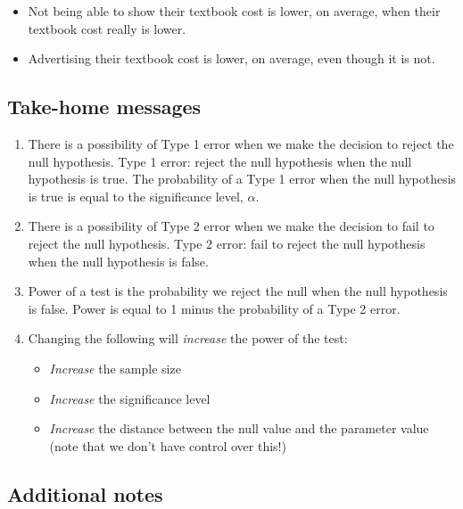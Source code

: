 \documentclass[
]{report}
\begin{document}
\begin{itemize}
\item
  Not being able to show their textbook cost is lower, on average, when their textbook cost really is lower.
\item
  Advertising their textbook cost is lower, on average, even though it is not.
\end{itemize}

\vspace{0.8in}

\subsection{Take-home messages}\label{take-home-messages-14}

\begin{enumerate}
\def\labelenumi{\arabic{enumi}.}
\item
  There is a possibility of Type 1 error when we make the decision to reject the null hypothesis. Type 1 error: reject the null hypothesis when the null hypothesis is true. The probability of a Type 1 error when the null hypothesis is true is equal to the significance level, \(\alpha\).
\item
  There is a possibility of Type 2 error when we make the decision to fail to reject the null hypothesis. Type 2 error: fail to reject the null hypothesis when the null hypothesis is false.
\item
  Power of a test is the probability we reject the null when the null hypothesis is false. Power is equal to 1 minus the probability of a Type 2 error.
\item
  Changing the following will \emph{increase} the power of the test:

  \begin{itemize}
  \item
    \emph{Increase} the sample size
  \item
    \emph{Increase} the significance level
  \item
    \emph{Increase} the distance between the null value and the parameter value (note that we don't have control over this!)
  \end{itemize}
\end{enumerate}

\subsection{Additional notes}\label{additional-notes-14}
\end{document}
